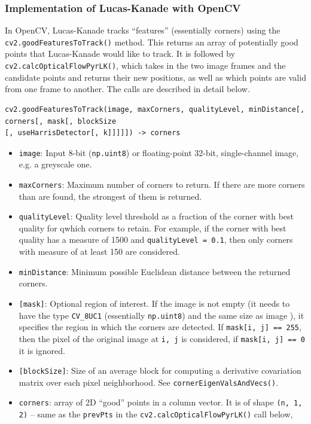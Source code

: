 \documentclass[a4paper]{article}
\begin{document}
\subsubsection{Implementation of Lucas-Kanade with OpenCV}

In OpenCV, Lucas-Kanade tracks ``features'' (essentially corners) using the \texttt{cv2.goodFeaturesToTrack()} method. This returns an array of potentially good points that Lucas-Kanade would like to track. It is followed by \texttt{cv2.calcOpticalFlowPyrLK()}, which takes in the two image frames and the candidate points and returns their new positions, as well as which points are valid from one frame to another. The calls are described in detail below.

\begin{verbatim}
cv2.goodFeaturesToTrack(image, maxCorners, qualityLevel, minDistance[, corners[, mask[, blockSize
[, useHarrisDetector[, k]]]]]) -> corners
\end{verbatim}
\begin{itemize}
    \item \texttt{image}:  Input 8-bit (\texttt{np.uint8}) or floating-point 32-bit, single-channel image, e.g. a greyscale one.
    \item \texttt{maxCorners}: Maximum number of corners to return. If there are more corners than are found, the strongest of them is returned.
    \item \texttt{qualityLevel}: Quality level threshold as a fraction of the corner with best quality for qwhich corners to retain. For example, if the corner with best quality has a measure of 1500 and \texttt{qualityLevel = 0.1}, then only corners with measure of at least 150 are considered. 
    \item \texttt{minDistance}: Minimum possible Euclidean distance between the returned corners.
    \item \texttt{[mask]}: Optional region of interest. If the image is not empty (it needs to have the type \texttt{CV_8UC1} (essentially \texttt{np.uint8}) and the same size as image ), it specifies the region in which the corners are detected. If \texttt{mask[i, j] == 255}, then the pixel of the original image at \texttt{i, j} is considered, if \texttt{mask[i, j] == 0} it is ignored.
    \item \texttt{[blockSize]}: Size of an average block for computing a derivative covariation matrix over each pixel neighborhood. See \texttt{cornerEigenValsAndVecs()}. 
    \item \texttt{corners}: array of 2D ``good'' points in a column vector. It is of shape \texttt{(n, 1, 2)} -- same as the \texttt{prevPts} in the \texttt{cv2.calcOpticalFlowPyrLK()} call below,
\end{itemize}
\end{document}
